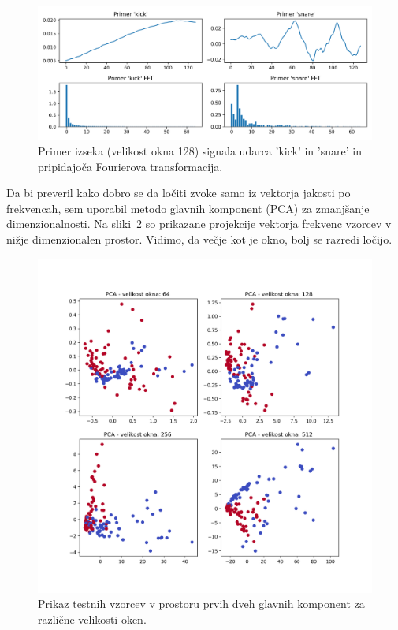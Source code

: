 \documentclass[11pt,a4paper]{article}
\begin{document}
\begin{figure}[h]
    \centering
    \includegraphics[width=\textwidth]{img/primer_kick_snare_fft128.png}
    \caption{Primer izseka (velikost okna 128) signala udarca 'kick' in 'snare' in pripidajoča Fourierova transformacija.}
    \label{fig:primer_kick_snare_fft128}
\end{figure}

Da bi preveril kako dobro se da ločiti zvoke samo iz vektorja jakosti po frekvencah, sem uporabil metodo glavnih komponent (PCA) za zmanjšanje dimenzionalnosti. Na sliki~\ref{fig:pca_fft} so prikazane projekcije vektorja frekvenc vzorcev v nižje dimenzionalen prostor. Vidimo, da večje kot je okno, bolj se razredi ločijo.

\begin{figure}[h]
    \centering
    \includegraphics[width=\textwidth]{img/pca_fft.png}
    \caption{Prikaz testnih vzorcev v prostoru prvih dveh glavnih komponent za različne velikosti oken.}
    \label{fig:pca_fft}
\end{figure}
\end{document}

